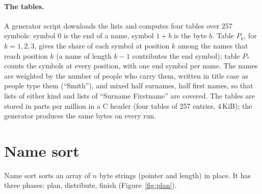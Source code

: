 \documentclass[11pt]{article}
\theoremstyle{definition}
\begin{document}
\paragraph{The tables.} A generator script downloads the lists and computes
four tables over 257 symbols: symbol 0 is the end of a name, symbol $1+b$ is
the byte $b$. Table $P_k$, for $k = 1, 2, 3$, gives the share of each symbol
at position $k$ among the names that reach position $k$ (a name of length
$k-1$ contributes the end symbol); table $P_\ast$ counts the symbols at every
position, with one end symbol per name. The names are weighted by the number
of people who carry them, written in title case as people type them
(``Smith''), and mixed half surnames, half first names, so that lists of
either kind and lists of ``Surname Firstname'' are covered. The tables are
stored in parts per million in a C header (four tables of 257 entries,
4\,KiB); the generator produces the
same bytes on every run.

\section{Name sort}\label{sec:namesort}

Name sort sorts an array of $n$ byte strings (pointer and length) in place.
It has three phases: plan, distribute, finish (Figure~\ref{fig:plan}).
\end{document}
